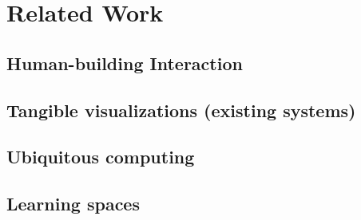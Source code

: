 \section{Related Work}

\subsection{Human-building Interaction}

\subsection{Tangible visualizations (existing systems)}

\subsection{Ubiquitous computing}

\subsection{Learning spaces}